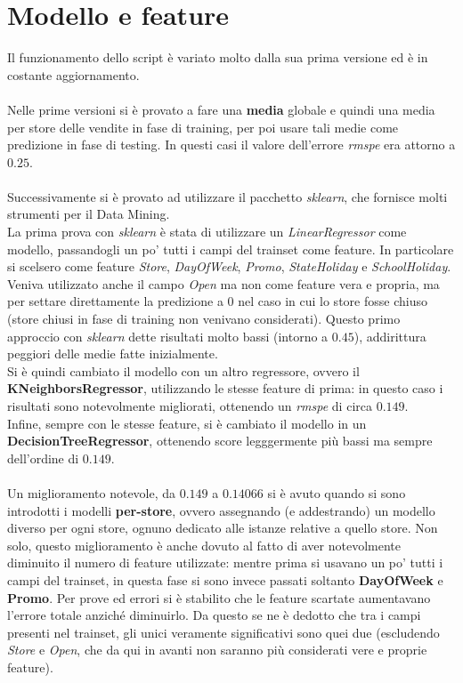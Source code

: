 \section*{Modello e feature}

Il funzionamento dello script è variato molto dalla sua prima versione ed è in costante aggiornamento.\\
\\
Nelle prime versioni si è provato a fare una \textbf{media} globale e quindi una media per store delle vendite in fase di training, per poi usare tali medie come predizione in fase di testing. In questi casi il valore dell'errore \textit{rmspe} era attorno a $0.25$.\\
\\
Successivamente si è provato ad utilizzare il pacchetto \textit{sklearn}, che fornisce molti strumenti per il Data Mining.\\
La prima prova con \textit{sklearn} è stata di utilizzare un \textit{LinearRegressor} come modello, passandogli un po' tutti i campi del trainset come feature. In particolare si scelsero come feature \textit{Store}, \textit{DayOfWeek}, \textit{Promo}, \textit{StateHoliday} e \textit{SchoolHoliday}. Veniva utilizzato anche il campo \textit{Open} ma non come feature vera e propria, ma per settare direttamente la predizione a $0$ nel caso in cui lo store fosse chiuso (store chiusi in fase di training non venivano considerati). Questo primo approccio con \textit{sklearn} dette risultati molto bassi (intorno a $0.45$), addirittura peggiori delle medie fatte inizialmente.\\
Si è quindi cambiato il modello con un altro regressore, ovvero il \textbf{KNeighborsRegressor}, utilizzando le stesse feature di prima: in questo caso i risultati sono notevolmente migliorati, ottenendo un \textit{rmspe} di circa $0.149$.\\
Infine, sempre con le stesse feature, si è cambiato il modello in un \textbf{DecisionTreeRegressor}, ottenendo score legggermente più bassi ma sempre dell'ordine di $0.149$.\\
\\
Un miglioramento notevole, da $0.149$ a $0.14066$ si è avuto quando si sono introdotti i modelli \textbf{per-store}, ovvero assegnando (e addestrando) un modello diverso per ogni store, ognuno dedicato alle istanze relative a quello store. Non solo, questo miglioramento è anche dovuto al fatto di aver notevolmente diminuito il numero di feature utilizzate: mentre prima si usavano un po' tutti i campi del trainset, in questa fase si sono invece passati soltanto \textbf{DayOfWeek} e \textbf{Promo}. Per prove ed errori si è stabilito che le feature scartate aumentavano l'errore totale anziché diminuirlo. Da questo se ne è dedotto che tra i campi presenti nel trainset, gli unici veramente significativi sono quei due (escludendo \textit{Store} e \textit{Open}, che da qui in avanti non saranno più considerati vere e proprie feature).\\
